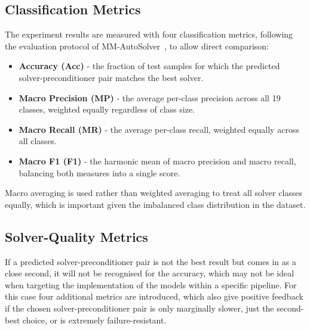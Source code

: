 \subsection{Classification Metrics}\label{subsec:classification-metrics}

The experiment results are measured with four classification metrics, following the evaluation protocol of MM-AutoSolver~\cite{xiong2025mmautosolver}, to allow direct comparison:

\begin{itemize}
  \item \textbf{Accuracy (Acc)} - the fraction of test samples for which the predicted solver-preconditioner pair matches the best solver.
  \item \textbf{Macro Precision (MP)} - the average per-class precision across all 19 classes, weighted equally regardless of class size.
  \item \textbf{Macro Recall (MR)} - the average per-class recall, weighted equally across all classes.
  \item \textbf{Macro F1 (F1)} - the harmonic mean of macro precision and macro recall, balancing both measures into a single score.
\end{itemize}

Macro averaging is used rather than weighted averaging to treat all solver classes equally, which is important given the imbalanced class distribution in the dataset.

\subsection{Solver-Quality Metrics}\label{subsec:solver-quality-metrics}

If a predicted solver-preconditioner pair is not the best result but comes in as a close second, it will not be recognised
for the accuracy, which may not be ideal when targeting the implementation of the models within a specific pipeline.
For this case four additional metrics are introduced, which also give positive feedback if the chosen solver-preconditioner
pair is only marginally slower, just the second-best choice, or is extremely failure-resistant.

